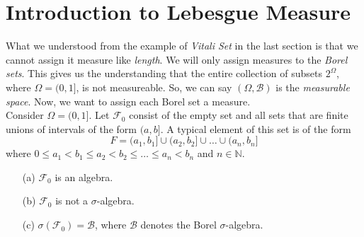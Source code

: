 \section{Introduction to Lebesgue Measure}

What we understood from the example of \textit{Vitali Set} in the last section is that we cannot assign it measure like \textit{length}. We will only assign measures to the \textit{Borel sets}. This gives us the understanding that the entire collection of subsets $2^\Omega$, where $\Omega = (0, 1]$, is not measureable. So, we can say $(\Omega, \mathcal{B})$ is the \textit{measurable space}. Now, we want to assign each Borel set a measure. \\

Consider \( \Omega = (0, 1] \). Let \( \mathcal{F}_0 \) consist of the empty set and all sets that are finite unions of intervals of the form \( (a, b] \). A typical element of this set is of the form
\[
F = (a_1, b_1] \cup (a_2, b_2] \cup \dots \cup (a_n, b_n]
\]
where \( 0 \leq a_1 < b_1 \leq a_2 < b_2 \leq \dots \leq a_n < b_n \) and \( n \in \mathbb{N} \).

\begin{lemma}
    \begin{itemize}
        \item[(a)] \( \mathcal{F}_0 \) is an algebra.
        \item[(b)] \( \mathcal{F}_0 \) is not a \( \sigma \)-algebra.
        \item[(c)] \( \sigma(\mathcal{F}_0) = \mathcal{B} \), where \( \mathcal{B} \) denotes the Borel \( \sigma \)-algebra.
    \end{itemize}
\end{lemma}

